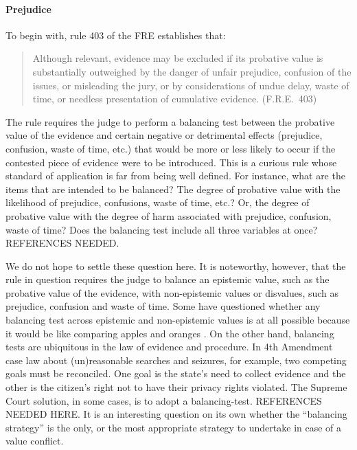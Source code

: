 \documentclass[10pt]{article}
\begin{document}
\paragraph{Prejudice}
To begin with, rule 403 of the FRE 
establishes that:
%
\begin{quote}
\begin{singlespace}
Although relevant, evidence may be excluded if its probative value is substantially outweighed by the danger of unfair prejudice, confusion of the issues, or misleading the jury, or by considerations of undue delay, waste of time, or needless presentation of cumulative evidence. (F.R.E.\ 403)
\end{singlespace}
\end{quote}
%
The rule requires the judge to perform a balancing test between the probative value of the evidence 
and certain negative or detrimental effects (prejudice, confusion, waste of time, etc.) that 
would be more or less likely to occur if the contested piece of evidence were to be introduced.
This is a curious rule whose standard of application is far from being 
well defined. For instance, what are the items that are intended to be balanced? 
The degree of probative value with the likelihood of prejudice, confusions, waste of time, etc.? 
Or, the degree of probative value with the degree of harm associated with prejudice, confusion, waste of time? Does the balancing 
test include all three variables at once?  REFERENCES NEEDED.

We do not hope to settle these question here. It is noteworthy, however, that the rule in question requires the judge to balance an 
epistemic value, such as the probative value of the evidence, with non-epistemic values or disvalues, 
such as prejudice, confusion and waste of time. %
Some have questioned whether any balancing test across epistemic and non-epistemic values is at all 
possible because it would be like comparing apples and oranges \citep{taruffo09}. On the other hand, balancing tests are ubiquitous 
in the law of evidence and procedure. 
In 4th Amendment case law about (un)reasonable searches and seizures, for example, two competing goals must be reconciled. One goal is the state's need to collect evidence and the other is the citizen's 
right not to have their privacy rights violated. The Supreme Court solution, in some cases, is to adopt a balancing-test. REFERENCES NEEDED HERE. It is an interesting question on its own
whether the ``balancing strategy'' is the only, or the most appropriate strategy to undertake in case of a value conflict.
\end{document}
